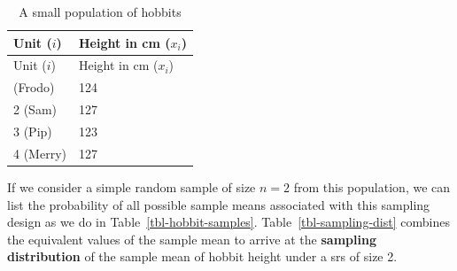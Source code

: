 \documentclass[
  13pt,
  letterpaper,
  DIV=11,
  numbers=noendperiod]{scrreprt}
\theoremstyle{plain}
\theoremstyle{definition}
\theoremstyle{definition}
\theoremstyle{remark}
\begin{document}
\begin{longtable}[]{@{}ll@{}}
\caption{A small population of
hobbits}\label{tbl-hobbit-pop}\tabularnewline
\toprule\noalign{}
Unit (\(i\)) & Height in cm (\(x_i\)) \\
\midrule\noalign{}
\endfirsthead
\toprule\noalign{}
Unit (\(i\)) & Height in cm (\(x_i\)) \\
\midrule\noalign{}
\endhead
\bottomrule\noalign{}
\endlastfoot
1 (Frodo) & 124 \\
2 (Sam) & 127 \\
3 (Pip) & 123 \\
4 (Merry) & 127 \\
\end{longtable}

If we consider a simple random sample of size \(n=2\) from this
population, we can list the probability of all possible sample means
associated with this sampling design as we do in
Table~\ref{tbl-hobbit-samples}. Table~\ref{tbl-sampling-dist} combines
the equivalent values of the sample mean to arrive at the
\textbf{sampling distribution} of the sample mean of hobbit height under
a srs of size 2.
\end{document}
